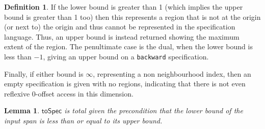 \documentclass[9pt]{sigplanconf}
\newcounter{block}
\newtheorem{lemma}[block]{Lemma}
\theoremstyle{definition}
\newtheorem{definition}[block]{Definition}
\begin{document}
\begin{definition}
If the lower bound is greater than 1
(which implies the upper bound is greater than 1 too) then
this represents a region that is not at the origin (or next to) the
origin and thus cannot be represented in the specification language.
Thus, an upper bound is instead returned showing the maximum extent
of the region. The penultimate case is the dual, when the lower bound is less
than $-1$, giving an upper bound on a \texttt{backward} specification.

Finally, if either bound is $\infty$, representing a non
neighbourhood index, then an empty specification is given
 with no regions, indicating that there is not even reflexive
0-offset access in this dimension.
\end{definition}

\begin{lemma}
$\mathsf{toSpec}$ is total 
 given the precondition that the lower
bound of the input span is less than or equal to its upper bound.
\end{lemma}
\end{document}
